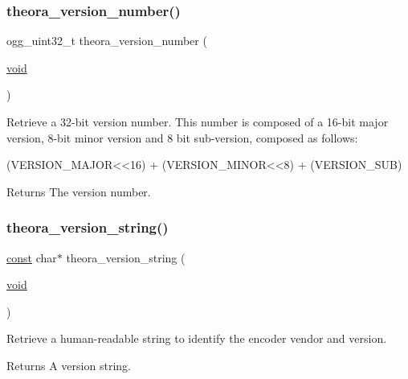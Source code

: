 \subsubsection{\texorpdfstring{theora\+\_\+version\+\_\+number()}{theora\_version\_number()}}
{\footnotesize\ttfamily ogg\+\_\+uint32\+\_\+t theora\+\_\+version\+\_\+number (\begin{DoxyParamCaption}\item[{\hyperlink{png_8h_ac9c84fa68bbad002983e35ce3663c686}{void}}]{ }\end{DoxyParamCaption})}

Retrieve a 32-\/bit version number. This number is composed of a 16-\/bit major version, 8-\/bit minor version and 8 bit sub-\/version, composed as follows\+: 
\begin{DoxyPre}
   (VERSION\_MAJOR<<16) + (VERSION\_MINOR<<8) + (VERSION\_SUB)
\end{DoxyPre}
 \begin{DoxyReturn}{Returns}
The version number. 
\end{DoxyReturn}
\mbox{\label{group__oldfuncs_ga5a3da8fd262a60f055f96536eec06df2}} 
\subsubsection{\texorpdfstring{theora\+\_\+version\+\_\+string()}{theora\_version\_string()}}
{\footnotesize\ttfamily \hyperlink{zconf_8h_a2c212835823e3c54a8ab6d95c652660e}{const} char$\ast$ theora\+\_\+version\+\_\+string (\begin{DoxyParamCaption}\item[{\hyperlink{png_8h_ac9c84fa68bbad002983e35ce3663c686}{void}}]{ }\end{DoxyParamCaption})}

Retrieve a human-\/readable string to identify the encoder vendor and version. \begin{DoxyReturn}{Returns}
A version string. 
\end{DoxyReturn}
